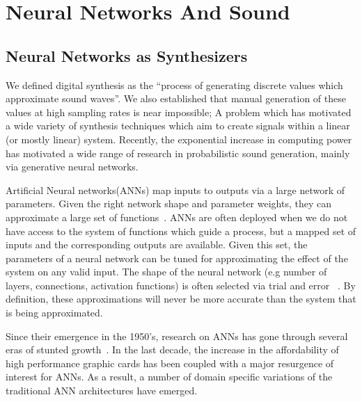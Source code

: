 \documentclass[\main/thesis.tex]{subfiles}
\begin{document}
\section{Neural Networks And Sound}
\label{bg:NN}

\subsection{Neural Networks as Synthesizers}
We defined digital synthesis as the \enquote{process of generating discrete values which approximate sound waves}. We also established that manual generation of these values at high sampling rates is near impossible; A problem which has motivated a wide variety of synthesis techniques which aim to create signals within a linear (or mostly linear) system. Recently, the exponential increase in computing power has motivated a wide range of research in probabilistic sound generation, mainly via generative neural networks. 

Artificial Neural networks(ANNs) map inputs to outputs via a large network of parameters. Given the right network shape and parameter weights, they can approximate a large set of functions~\cite{cybenko1989approximation,cardaliaguet1992approximation}. ANNs are often deployed when we do not have access to the system of functions which guide a process, but a mapped set of inputs and the corresponding outputs are available. Given this set, the parameters of a neural network can be tuned for approximating the effect of the system on any valid input. The shape of the neural network (e.g number of layers, connections, activation functions) is often selected via trial and error ~\cite{bergstra2012random,bergstra2011algorithms,ba2013adaptive}. By definition, these approximations will never be more accurate than the system that is being approximated. 

Since their emergence in the 1950's, research on ANNs has gone through several eras of stunted growth~\cite{basheer2000artificial,anderson1988neurocomputing}.  In the last decade, the increase in the affordability of high performance graphic cards has been coupled with a major resurgence of interest for ANNs. As a result, a number of domain specific variations of the traditional ANN architectures have emerged. 
\end{document}

